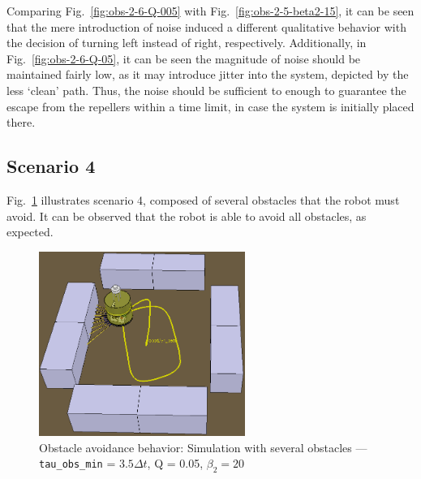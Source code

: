 Comparing Fig.~\ref{fig:obs-2-6-Q-005} with Fig.~\ref{fig:obs-2-5-beta2-15}, it
can be seen that the mere introduction of noise induced a different qualitative
behavior with the decision of turning left instead of right,
respectively. Additionally, in Fig.~\ref{fig:obs-2-6-Q-05}, it can be seen the
magnitude of noise should be maintained fairly low, as it may introduce jitter
into the system, depicted by the less `clean' path. Thus, the noise should be
sufficient to enough to guarantee the escape from the repellers within a time
limit, in case the system is initially placed there.

\subsection{Scenario 4}%
\label{sec:scenario-4-obs}
Fig.~\ref{fig:obs-2-7} illustrates scenario 4, composed of several obstacles
that the robot must avoid. It can be observed that the robot is able to avoid
all obstacles, as expected.

\begin{figure}[!hbt]
\centering
    \includegraphics[width=0.6\textwidth]{./img/obs-2-7.png}
  \caption[Obstacle avoidance behavior: Simulation with several obstacles]{Obstacle avoidance behavior: Simulation with several obstacles --- \texttt{tau\_obs\_min} =
    $3.5 \Delta t$, Q = 0.05, $\beta_2 = 20$}%
\label{fig:obs-2-7}
\end{figure}
